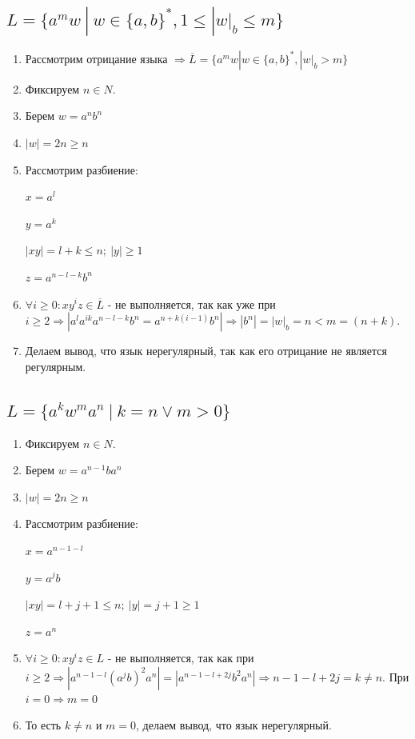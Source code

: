 \documentclass[a4paper,12pt]{article}
\begin{document}
\subsection{$L = \{a^mw \: | \: w \in \{a, b\}^{*}, 1 \leq |w|_b \leq m\}$}

\begin{enumerate}
    \item Рассмотрим отрицание языка $\Rightarrow \overline{L}=\{a^mw | w \in \{a,b\}^*, |w|_b > m\}$
    \item Фиксируем $n \in N$.
    \item Берем $w = a^nb^n$
    \item $|w|= 2n \geq n$
    \item Рассмотрим разбиение:
    
    $x = a^{l}$
    
    $y = a^{k}$
    
    $|xy| = l + k \leq n; \: |y| \geq 1$
    
    $z = a^{n - l - k}b^n$
    
    \item $\forall i \geq 0: xy^iz \in \overline{L}$ - не выполняется, так как уже при $i \geq 2 \Rightarrow |a^{l}a^{ik}a^{n - l - k}b^n = a^{n + k(i-1)}b^n| \Rightarrow |b^n| = |w|_b = n < m = (n + k)$.
    \item Делаем вывод, что язык нерегулярный, так как его отрицание не является регулярным.
\end{enumerate}

\subsection{$L = \{a^kw^ma^n \: | \: k = n \lor m > 0\}$}

\begin{enumerate}
    \item Фиксируем $n \in N$.
    \item Берем $w = a^{n - 1}ba^n$
    \item $|w| = 2n \geq n$
    \item Рассмотрим разбиение:
    
    $x = a^{n - 1 - l}$
    
    $y = a^{j}b$
    
    $|xy| = l + j + 1 \leq n; \: |y| = j + 1 \geq 1$
    
    $z = a^{n}$
    
    \item $\forall i \geq 0: xy^iz \in L$ - не выполняется, так как при $i \geq 2 \Rightarrow |a^{n - 1 - l}(a^jb)^2a^n| = |a^{n - 1 - l + 2j}b^2a^n| \Rightarrow n - 1 - l + 2j = k \neq n$. При $i = 0 \Rightarrow m = 0$
    \item То есть $k \neq n$ и $m = 0$, делаем вывод, что язык нерегулярный.
\end{enumerate}
\end{document}
